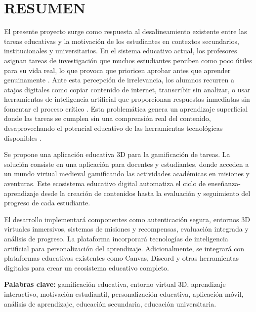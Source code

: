 \section{RESUMEN}

El presente proyecto surge como respuesta al desalineamiento existente entre las tareas educativas y la motivación de los estudiantes en contextos secundarios, institucionales y universitarios. En el sistema educativo actual, los profesores asignan tareas de investigación que muchos estudiantes perciben como poco útiles para su vida real, lo que provoca que prioricen aprobar antes que aprender genuinamente \cite{deci2017}. Ante esta percepción de irrelevancia, los alumnos recurren a atajos digitales como copiar contenido de internet, transcribir sin analizar, o usar herramientas de inteligencia artificial que proporcionan respuestas inmediatas sin fomentar el proceso crítico \cite{chen2023}. Esta problemática genera un aprendizaje superficial donde las tareas se cumplen sin una comprensión real del contenido, desaprovechando el potencial educativo de las herramientas tecnológicas disponibles \cite{martinez2023}.

Se propone una aplicación educativa 3D para la gamificación de tareas. La solución consiste en una aplicación para docentes y estudiantes, donde acceden a un mundo virtual medieval gamificando las actividades académicas en misiones y aventuras. Este ecosistema educativo digital automatiza el ciclo de enseñanza-aprendizaje desde la creación de contenidos hasta la evaluación y seguimiento del progreso de cada estudiante.

El desarrollo implementará componentes como autenticación segura, entornos 3D virtuales inmersivos, sistemas de misiones y recompensas, evaluación integrada y análisis de progreso. La plataforma incorporará tecnologías de inteligencia artificial para personalización del aprendizaje. Adicionalmente, se integrará con plataformas educativas existentes como Canvas, Discord y otras herramientas digitales para crear un ecosistema educativo completo.

\textbf{Palabras clave:} gamificación educativa, entorno virtual 3D, aprendizaje interactivo, motivación estudiantil, personalización educativa, aplicación móvil, análisis de aprendizaje, educación secundaria, educación universitaria.

